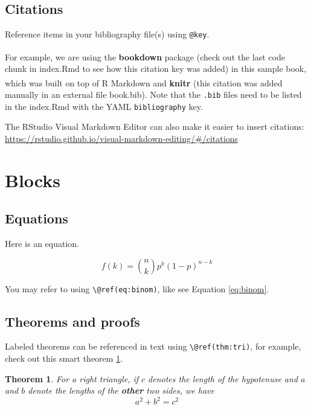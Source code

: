 \documentclass[
]{book}
\newtheorem{theorem}{Theorem}[chapter]
\theoremstyle{definition}
\theoremstyle{definition}
\theoremstyle{definition}
\theoremstyle{definition}
\theoremstyle{remark}
\begin{document}
\subsection{Citations}\label{citations}

Reference items in your bibliography file(s) using \texttt{@key}.

For example, we are using the \textbf{bookdown} package\textsuperscript{} (check out the last code chunk in index.Rmd to see how this citation key was added) in this sample book, which was built on top of R Markdown and \textbf{knitr}\textsuperscript{} (this citation was added manually in an external file book.bib).
Note that the \texttt{.bib} files need to be listed in the index.Rmd with the YAML \texttt{bibliography} key.

The RStudio Visual Markdown Editor can also make it easier to insert citations: \url{https://rstudio.github.io/visual-markdown-editing/\#/citations}

\section{Blocks}\label{blocks}

\subsection{Equations}\label{equations}

Here is an equation.

\begin{equation} 
  f\left(k\right) = \binom{n}{k} p^k\left(1-p\right)^{n-k}
  \label{eq:binom}
\end{equation}

You may refer to using \texttt{\textbackslash{}@ref(eq:binom)}, like see Equation \eqref{eq:binom}.

\subsection{Theorems and proofs}\label{theorems-and-proofs}

Labeled theorems can be referenced in text using \texttt{\textbackslash{}@ref(thm:tri)}, for example, check out this smart theorem \ref{thm:tri}.

\begin{theorem}
\protect\hypertarget{thm:tri}{}\label{thm:tri}For a right triangle, if \(c\) denotes the \emph{length} of the hypotenuse
and \(a\) and \(b\) denote the lengths of the \textbf{other} two sides, we have
\[a^2 + b^2 = c^2\]
\end{theorem}
\end{document}
